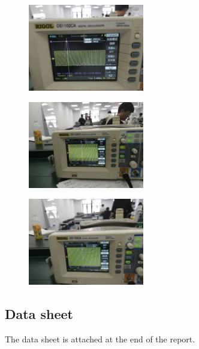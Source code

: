 \documentclass{article}
\begin{document}
\begin{figure}\centering
    \includegraphics[width=0.45\textwidth]{8}
\end{figure}

\begin{figure}\centering
    \includegraphics[width=0.45\textwidth]{9}
\end{figure}

\begin{figure}\centering
    \includegraphics[width=0.45\textwidth]{10}
\end{figure}


\subsection{Data sheet}
The data sheet is attached at the end of the report.
\end{document}

